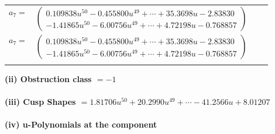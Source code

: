 \documentclass[1p]{elsarticle_modified}
\theoremstyle{definition}
\begin{document}
\begin{tabular}{m{7pt} m{180pt} m{7pt} m{180pt} }
\flushright $a_{7}=$&$\begin{pmatrix}0.109838 u^{50}-0.455800 u^{49}+\cdots+35.3698 u-2.83830\\-1.41865 u^{50}-6.00756 u^{49}+\cdots+4.72198 u-0.768857\end{pmatrix}$\\ \flushright $a_{7}=$&$\begin{pmatrix}0.109838 u^{50}-0.455800 u^{49}+\cdots+35.3698 u-2.83830\\-1.41865 u^{50}-6.00756 u^{49}+\cdots+4.72198 u-0.768857\end{pmatrix}$\\&\end{tabular}
\flushleft \textbf{(ii) Obstruction class $= -1$}\\~\\
\flushleft \textbf{(iii) Cusp Shapes $= 1.81706 u^{50}+20.2990 u^{49}+\cdots-41.2566 u+8.01207$}\\~\\
\newpage\renewcommand{\arraystretch}{1}
\flushleft \textbf{(iv) u-Polynomials at the component}\newline \\
\end{document}
